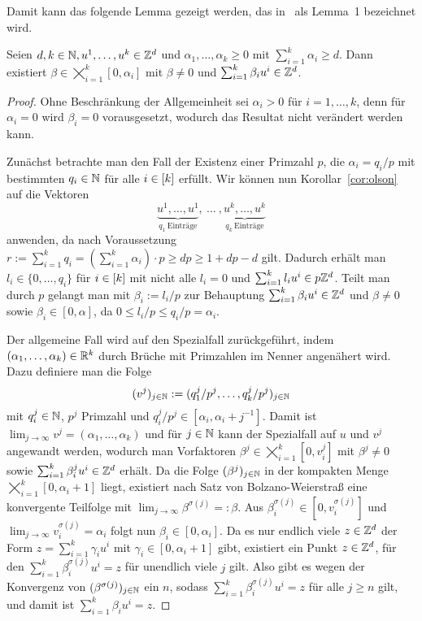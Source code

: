 Damit kann das folgende Lemma gezeigt werden, das in~\cite{Paat2018} als Lemma~1 bezeichnet wird.

\begin{lemma}\label{lem:olson}
	Seien $d,k\in\mathbb{N}, u^1,\dots, u^k\in\mathbb{Z}^d$ und $\alpha_1,\dots,\alpha_k\geq0$ mit $\sum_{i=1}^k \alpha_i\geq d$.
	Dann existiert $\beta\in\bigtimes_{i=1}^k[0,\alpha_i]$ mit $\beta\neq0$ und $\sum_{i=1}^k\beta_i u^i \in\mathbb{Z}^d$.
\end{lemma}
\begin{proof}
	\newcommand{\bbeta}{\tilde{\beta}}
	Ohne Beschränkung der Allgemeinheit sei $\alpha_i>0$ für $i=1,\dots,k$, denn für $\alpha_i=0$ wird $\beta_i=0$ vorausgesetzt, wodurch das Resultat nicht verändert werden kann.
	
	Zunächst betrachte man den Fall der Existenz einer Primzahl $p$, die $\alpha_i=q_i / p$ mit bestimmten $q_i\in\mathbb{N}$ für alle $i\in[k]$ erfüllt.
	Wir können nun Korollar~\ref{cor:olson} auf die Vektoren
	$$\underbrace{u^1,\dots,u^1}_{q_1~\text{Einträge}},~\dots~,\underbrace{u^k,\dots,u^k}_{q_k~\text{Einträge}}$$
	anwenden, da nach Voraussetzung $r:=\sum_{i=1}^k q_i=(\sum_{i=1}^k \alpha_i)\cdot p\geq dp \geq 1+dp-d$ gilt.
	Dadurch erhält man $l_i\in\{0,\dots,q_i\}$ für $i\in[k]$ mit nicht alle $l_i=0$ und $\sum_{i=1}^k l_i u^i\in p\mathbb{Z}^d$.
	Teilt man durch $p$ gelangt man mit $\beta_i := l_i/p$ zur Behauptung $\sum_{i=1}^k \beta_i u^i\in\mathbb{Z}^d$ und $\beta\neq0$ sowie $\beta_i\in[0,\alpha]$, da $0\leq l_i/p\leq q_i/p=\alpha_i$.
	
	Der allgemeine Fall wird auf den Spezialfall zurückgeführt, indem $(\alpha_1,\dots,\alpha_k)\in\mathbb{R}^k$ durch Brüche mit Primzahlen im Nenner angenähert wird.
	Dazu definiere man die Folge 
	$$
	(v^j)_{j\in\mathbb{N}}:=(q^j_1/p^j,\dots,q^j_k/p^j)_{j\in\mathbb{N}}$$
	mit $q^j_i\in\mathbb{N}$, $p^j$ Primzahl und $q^j_i/p^j\in[\alpha_i, \alpha_i+j^{-1}]$.
	Damit ist $\lim_{j\rightarrow\infty}v^j=(\alpha_1,\dots,\alpha_k)$ und für $j\in\mathbb{N}$ kann der Spezialfall auf $u$ und $v^j$ angewandt werden, wodurch man Vorfaktoren $\beta^j\in\bigtimes_{i=1}^k[0,v^j_i]$ mit $\beta^j\neq0$ sowie $\sum_{i=1}^k\beta^j_i u^i \in\mathbb{Z}^d$ erhält.
	Da die Folge $(\beta^j)_{j\in\mathbb{N}}$ in der kompakten Menge $\bigtimes_{i=1}^k[0,\alpha_i+1]$ liegt, existiert nach Satz von Bolzano-Weierstraß eine konvergente Teilfolge mit $\lim_{j\to\infty} \beta^{\sigma(j)}=:\beta$.
	Aus $\beta^{\sigma(j)}_i\in[0,v^{\sigma(j)}_i]$ und $\lim_{j\to\infty}v^{\sigma(j)}_i=\alpha_i$ folgt nun $\beta_i\in[0,\alpha_i]$.
	Da es nur endlich viele $z\in\mathbb{Z}^d$ der Form $z=\sum_{i=1}^k\gamma_i u^i$ mit $\gamma_i\in[0,\alpha_i+1]$ gibt, existiert ein Punkt $z\in\mathbb{Z}^d$, für den $\sum_{i=1}^k \beta^{\sigma(j)}_i u^i=z$ für unendlich viele $j$ gilt.
	Also gibt es wegen der Konvergenz von $(\beta^{\sigma(j)})_{j\in\mathbb{N}}$ ein $n$, sodass $\sum_{i=1}^k\beta^{\sigma(j)}_i u^i=z$ für alle $j\geq n$ gilt, und damit ist $\sum_{i=1}^k\beta_i u^i=z$.
	

\end{proof}
